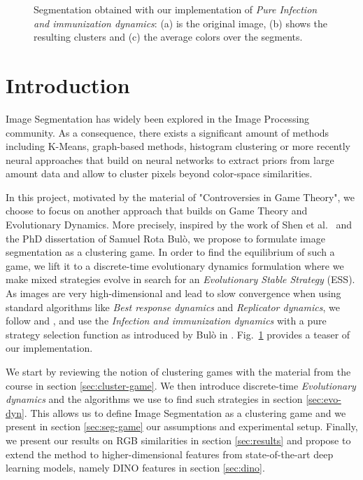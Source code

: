 \documentclass[11pt,a4paper]{article}
\begin{document}
\begin{figure}[H]
\begin{subfigure}[b]{0.3\textwidth}
        \caption{ }
    \end{subfigure}
       \caption{Segmentation obtained with our implementation of \textit{Pure Infection and immunization dynamics}: (a) is the original image, (b) shows the resulting clusters and (c) the average colors over the segments.}
       \label{fig:teaser}
\end{figure}

\section{Introduction}

Image Segmentation has widely been explored in the Image Processing community. As a consequence, there exists a significant amount of methods including K-Means, graph-based methods\cite{graph-segmentation}, histogram clustering\cite{histogram-clustering} or more recently neural approaches that build on neural networks to extract priors from large amount data\cite{panoptic-segmentation} and allow to cluster pixels beyond color-space similarities.

In this project, motivated by the material of "Controversies in Game Theory"\cite{course-gt}, we choose to focus on another approach that builds on Game Theory and Evolutionary Dynamics. More precisely, inspired by the work of Shen et al.~\cite{game-clustering} and the PhD dissertation of Samuel Rota Bulò\cite{bulo-thesis}, we propose to formulate image segmentation as a clustering game. In order to find the equilibrium of such a game, we lift it to a discrete-time evolutionary dynamics formulation where we make mixed strategies evolve in search for an \textit{Evolutionary Stable Strategy} (ESS). As images are very high-dimensional and lead to slow convergence when using standard algorithms like \textit{Best response dynamics} and \textit{Replicator dynamics}, we follow \cite{game-clustering} and \cite{bulo-thesis}, and use the \textit{Infection and immunization dynamics} with a pure strategy selection function as introduced by Bulò in \cite{inimdyn}. Fig.~\ref{fig:teaser} provides a teaser of our implementation.

We start by reviewing the notion of clustering games with the material from the course\cite{course-gt} in section \ref{sec:cluster-game}. We then introduce discrete-time \textit{Evolutionary dynamics} and the algorithms we use to find such strategies in section \ref{sec:evo-dyn}. This allows us to define Image Segmentation as a clustering game and we present in section \ref{sec:seg-game} our assumptions and experimental setup. Finally, we present our results on RGB similarities in section \ref{sec:results} and propose to extend the method to higher-dimensional features from state-of-the-art deep learning models, namely DINO features\cite{dino} in section \ref{sec:dino}.
\end{document}
